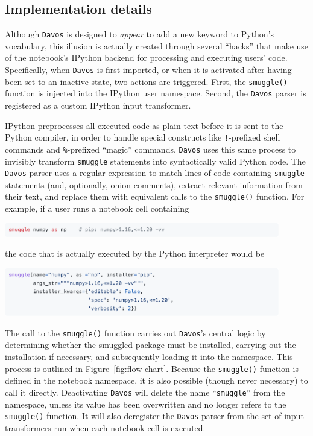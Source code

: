 \documentclass[preprint,12pt,a4paper]{elsarticle}
\begin{document}
\subsection{Implementation details}\label{subsec:implementation}

Although \texttt{Davos} is designed to \textit{appear} to add a new
keyword to Python's vocabulary, this illusion is actually created through
several ``hacks'' that make use of the notebook's IPython backend
for processing and executing users' code. Specifically, when
\texttt{Davos} is first imported, or when it is activated after having been
set to an inactive state, two actions are triggered. First, the
\texttt{smuggle()} function is injected into the IPython user
namespace. Second, the \texttt{Davos} parser is registered as a
custom IPython input transformer.

IPython preprocesses all executed code as plain text before it is sent
to the Python compiler, in order to handle special constructs like
\mbox{\texttt{!}-pre}\-fixed shell commands and \mbox{\texttt{\%}-pre}\-fixed ``magic'' commands. \texttt{Davos} uses
this same process to invisibly transform \texttt{smuggle} statements into
syntactically valid Python code. The \texttt{Davos} parser uses a
regular expression to match lines of code containing \texttt{smuggle}
statements (and, optionally, onion comments), extract relevant
information from their text, and replace them with equivalent calls to
the \texttt{smuggle()} function. For example, if a user runs a
notebook cell containing
\begin{center}
\includegraphics[width=0.9\textwidth]{figs/snippet6}
\end{center}
the code that is actually executed by the Python interpreter would be
\begin{center}
\includegraphics[width=0.9\textwidth]{figs/snippet7}
\end{center}
The call to the \texttt{smuggle()} function carries out
\texttt{Davos}'s central logic by determining whether the smuggled
package must be installed, carrying out the installation if necessary,
and subsequently loading it into the namespace. This process is
outlined in Figure~\ref{fig:flow-chart}. Because the
\texttt{smuggle()} function is defined in the notebook namespace, it
is also possible (though never necessary) to call it
directly. Deactivating \texttt{Davos} will delete the name
``\texttt{smuggle}'' from the namespace, unless its value has been
overwritten and no longer refers to the \texttt{smuggle()}
function. It will also deregister the \texttt{Davos} parser from the
set of input transformers run when each notebook cell is
executed.
\end{document}
